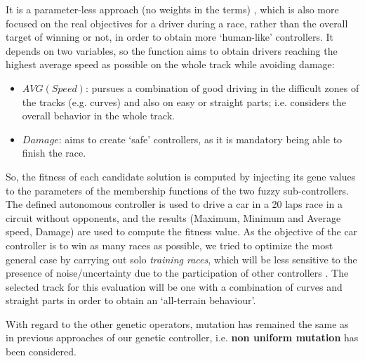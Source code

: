 \documentclass[conference]{IEEEtran}
\begin{document}
It is a parameter-less approach (no weights in the terms) \cite{Harik-ParameterLess99}, which is also more focused on the real objectives for a driver during a race, rather than the overall target of winning or not,
in order to obtain more `human-like' controllers. It depends on two variables, so the function aims to obtain drivers reaching the highest average speed as possible on the whole track while avoiding damage:

\begin{itemize}
\item $AVG(Speed)$: pursues a combination of good driving in the difficult zones of the tracks (e.g. curves) and also on easy or straight parts; i.e. considers the overall behavior in the whole track.
\item $Damage$: aims to create `safe' controllers, as it is mandatory being able to finish the race.
\end{itemize} 

So, the fitness of each candidate solution is computed by injecting its gene values to the parameters of the membership functions of the two fuzzy sub-controllers. The defined autonomous controller is used to drive a
car in a 20 laps race in a circuit without opponents, and the results (Maximum, Minimum and Average speed, Damage) are used to compute the fitness value. 
As the objective of the car controller is to win as many races as
possible, we tried to optimize the most general case by carrying out solo {\em training races}, which will be less sensitive to the presence of noise/uncertainty due to the participation of other controllers \cite{merelo2016statistical}.
The selected track for this evaluation will be one with a combination of curves and straight parts in order to obtain an `all-terrain behaviour'.

With regard to the other genetic operators, mutation has remained the same as in previous approaches of our genetic controller, i.e. \textbf{non uniform mutation} \cite{mutation1997} has been considered. 
\end{document}
